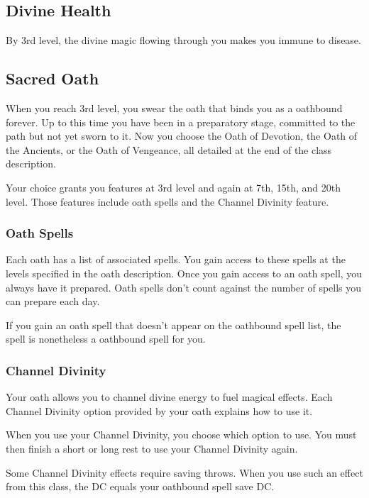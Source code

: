 \subsection{Divine Health}

By 3rd level, the divine magic flowing through you makes you immune to disease.

\subsection{Sacred Oath}

When you reach 3rd level, you swear the oath that binds you as a oathbound forever. Up to this time you have been in a preparatory stage, committed to the path but not yet sworn to it. Now you choose the Oath of Devotion, the Oath of the Ancients, or the Oath of Vengeance, all detailed at the end of the class description.

Your choice grants you features at 3rd level and again at 7th, 15th, and 20th level. Those features include oath spells and the Channel Divinity feature.

\subsubsection{Oath Spells}

Each oath has a list of associated spells. You gain access to these spells at the levels specified in the oath description. Once you gain access to an oath spell, you always have it prepared. Oath spells don't count against the number of spells you can prepare each day.

If you gain an oath spell that doesn't appear on the oathbound spell list, the spell is nonetheless a oathbound spell for you.

\subsubsection{Channel Divinity}

Your oath allows you to channel divine energy to fuel magical effects. Each Channel Divinity option provided by your oath explains how to use it.

When you use your Channel Divinity, you choose which option to use. You must then finish a short or long rest to use your Channel Divinity again.

Some Channel Divinity effects require saving throws. When you use such an effect from this class, the DC equals your oathbound spell save DC.

